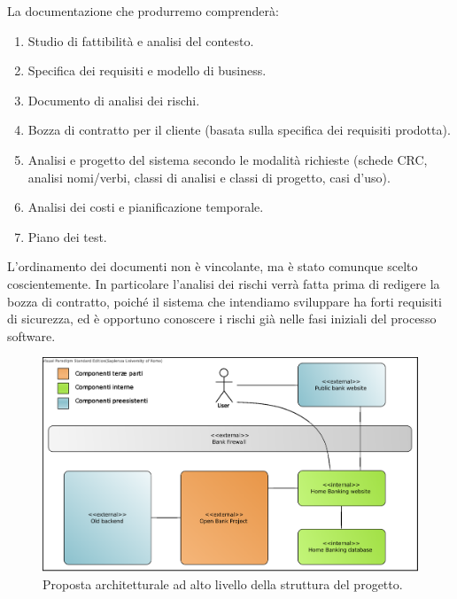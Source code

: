 \documentclass[10pt]{softeng} %
\begin{document}
La documentazione che produrremo comprender\`a:
\begin{enumerate}
	\item Studio di fattibilit\`a e analisi del contesto.
	\item Specifica dei requisiti e modello di business.
	\item Documento di analisi dei rischi.
	\item Bozza di contratto per il cliente (basata sulla specifica dei requisiti prodotta).
	\item Analisi e progetto del sistema secondo le modalit\`a richieste (schede CRC, analisi nomi/verbi, classi di analisi e classi di progetto, casi d'uso).
	\item Analisi dei costi e pianificazione temporale.
	\item Piano dei test.
\end{enumerate}
L'ordinamento dei documenti non \`e vincolante, ma \`e stato comunque scelto coscientemente.
In particolare l'analisi dei rischi verr\`a fatta prima di redigere la bozza di contratto, poich\'e il sistema che intendiamo sviluppare ha forti requisiti di sicurezza, ed \`e opportuno conoscere i rischi gi\`a nelle fasi iniziali del processo software.


\printcustombib{}


\graphicspath{{Images/}}
\begin{figure}[hbt]
	\centering
	\includegraphics[width=\textwidth]{struttura_progetto}
	\caption{Proposta architetturale ad alto livello della struttura del progetto.}
	\label{fig:project_structure}
\end{figure}
\end{document}
